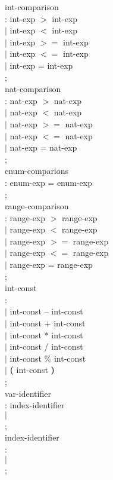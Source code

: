 \begin{tab}
\begin{tabbing}
int-comparison \\
\>: int-exp $>$ int-exp \\
\>$|$ int-exp $<$ int-exp \\
\>$|$ int-exp $>=$ int-exp \\
\>$|$ int-exp $<=$ int-exp \\
\>$|$ int-exp = int-exp \\
\>; \\


nat-comparison \\
\>: nat-exp $>$ nat-exp \\
\>$|$ nat-exp $<$ nat-exp \\
\>$|$ nat-exp $>=$ nat-exp \\
\>$|$ nat-exp $<=$ nat-exp \\
\>$|$ nat-exp = nat-exp \\
\>; \\

enum-comparions\\
\>: enum-exp = enum-exp \\
\>; \\


range-comparison\\
\>: range-exp $>$ range-exp \\
\>$|$ range-exp $<$ range-exp \\
\>$|$ range-exp $>=$ range-exp \\
\>$|$ range-exp $<=$ range-exp \\
\>$|$ range-exp = range-exp \\
\>; \\

int-const \\
\>: \NATNUM \\
\>$|$ int-const -- int-const \\
\>$|$ int-const + int-const \\
\>$|$ int-const * int-const \\
\>$|$ int-const / int-const \\
\>$|$ int-const \% int-const \\
\>$|$ {\bf (} int-const {\bf )} \\
\>;\\


var-identifier \\
\>: index-identifier \\
\>$|$ \IDENTIFIER  \\
\>; \\

index-identifier \\
\>: \ARRAYORBITVECID[ \IDENTIFIER ] \\
\>$|$ \ARRAYORBITVECID[ \NATNUM ] \\
\>;  \\

\end{tabbing}
\end{tab}












